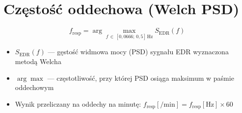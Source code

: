 \documentclass[12pt]{article}
\begin{document}
\section*{Częstość oddechowa (Welch PSD)}

\[
  f_{\mathrm{resp}} = \arg\max_{f \,\in\, [0{,}0666;\,0{,}5]\,\mathrm{Hz}} S_{\mathrm{EDR}}(f)
\]

\begin{itemize}
  \item $S_{\mathrm{EDR}}(f)$ — gęstość widmowa mocy (PSD) sygnału EDR wyznaczona metodą Welcha
  \item $\arg\max$ — częstotliwość, przy której PSD osiąga maksimum w paśmie oddechowym
  \item Wynik przeliczany na oddechy na minutę: $f_{\mathrm{resp}}[\mathrm{/min}] = f_{\mathrm{resp}}[\mathrm{Hz}] \times 60$
\end{itemize}
\end{document}
